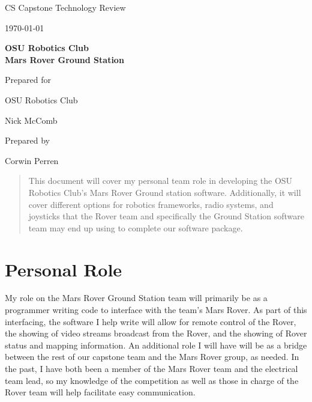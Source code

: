 \documentclass[onecolumn, draftclsnofoot, 10pt, compsoc]{IEEEtran}
\def \CapstoneTeamName{			Ground Station Software Team}
\def \CapstoneTeamNumber{		30}
\def \GroupMemberOne{			}
\def \GroupMemberTwo{			}
\def \GroupMemberThree{			Corwin Perren}
\def \CapstoneProjectName{		OSU Robotics Club\\Mars Rover Ground Station}
\def \CapstoneSponsorCompany{	OSU Robotics Club}
\def \CapstoneSponsorPerson{	Nick McComb}
\def \DocType{	%
				Technology Review
			 }
\newcommand{\NameSigPair}[1]{
  \par
  \makebox[2.75in][r]{#1} 
  \hfill
  \makebox[3.25in]{
      \makebox[2.25in]{\hrulefill} 
      \hfill
      \makebox[.75in]{\hrulefill}
  }
  \par\vspace{-12pt} 
  \textit{
      \tiny\noindent
      \makebox[2.75in]{} 
      \hfill
      \makebox[3.25in]{
          \makebox[2.25in][r]{Signature} 
          \hfill
          \makebox[.75in][r]{Date}
      }
  }
}
\renewcommand{\NameSigPair}[1]{#1}
\begin{document}
\begin{titlepage}
\begin{singlespace}
		\par\vspace{.35in}
		\centering
		\scshape{
			\huge CS Capstone \DocType \par
			{\large\today}\par
			\vspace{.5in}
			\textbf{\Huge\CapstoneProjectName}\par
			\vfill
			{\large Prepared for}\par
			\Huge \CapstoneSponsorCompany\par
			\vspace{5pt}
			{\Large\NameSigPair{\CapstoneSponsorPerson}\par}
			{\large Prepared by }\par
			\vspace{5pt}
			{\Large
				\NameSigPair{\GroupMemberOne}\par
				\NameSigPair{\GroupMemberTwo}\par
				\NameSigPair{\GroupMemberThree}\par
			}
			\vspace{20pt}
            \begin{abstract}
            This document will cover my personal team role in developing the OSU Robotics Club's Mars Rover Ground station software.
            Additionally, it will cover different options for robotics frameworks, radio systems, and joysticks that the Rover team and specifically the Ground Station software team may end up using to complete our software package.
		\end{abstract}
		}
	\end{singlespace}
\end{titlepage}
\newpage
{}
\tableofcontents
\clearpage
\section{Personal Role}
My role on the Mars Rover Ground Station team will primarily be as a programmer writing code to interface with the team's Mars Rover. 
As part of this interfacing, the software I help write will allow for remote control of the Rover, the showing of video streams broadcast from the Rover, and the showing of Rover status and mapping information.
An additional role I will have will be as a bridge between the rest of our capstone team and the Mars Rover group, as needed.
In the past, I have both been a member of the Mars Rover team and the electrical team lead, so my knowledge of the competition as well as those in charge of the Rover team will help facilitate easy communication.
\end{document}
